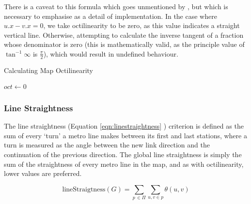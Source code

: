 There is a caveat to this formula which goes unmentioned by \citeauthor{AutomaticMetroMapLayoutThesis}, but which is necessary to emphasise as a detail of implementation. In the case where $u.x - v.x = 0$, we take octilinearity to be zero, as this value indicates a straight vertical line. Otherwise, attempting to calculate the inverse tangent of a fraction whose denominator is zero (this is mathematically valid, as the principle value of $\tan^{-1}\infty$ is $\frac{\pi}{2}$), which would result in undefined behaviour.\\
\begin{algorithm}
\label{alg:octilinearity}
 \caption{Calculating Map Octilinearity}
 $oct \gets 0$ \;
\end{algorithm}

\subsubsection{Line Straightness}

The line straightness (Equation \ref{eqn:linestraightness} \citep{AutomaticMetroMapLayoutThesis}) criterion is defined as the sum of every `turn' a metro line makes between its first and last stations, where a turn is measured as the angle between the new link direction and the continuation of the previous direction. The global line straightness is simply the sum of the straightness of every metro line in the map, and as with octilinearity, lower values are preferred.

\begin{equation}
	\text{lineStraigtness}(G) = \sum_{p\,\in{\Pi}}\sum_{u, v\in p} \theta(u, v)
\label{eqn:linestraightness}
\end{equation}

